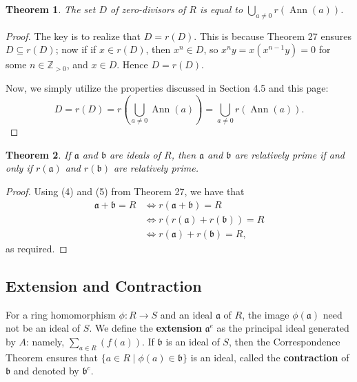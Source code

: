 \documentclass[11pt]{article}
\newtheorem{theorem}{Theorem}
\newcommand{\Ann}{\operatorname{Ann}}
\begin{document}
\begin{adjustwidth}{0.5cm}{}
	\begin{theorem}
		The set $D$ of zero-divisors of $R$ is equal to $\bigcup\limits_{a \ne 0} r(\Ann (a))$.
	\end{theorem}
	\begin{proof}
		The key is to realize that $D = r(D)$. This is because Theorem 27 ensures $D \subseteq r(D)$; now if if $x \in r(D)$, then $x^{n} \in D$, so $x^{n}y = x(x^{n - 1}y) = 0$ for some $n \in \mathbb{Z}_{> 0}$, and $x \in D$. Hence $D = r(D)$.

		Now, we simply utilize the properties discussed in Section 4.5 and this page:
		\[
			D = r(D) = r \left( \bigcup\limits_{a \ne 0} \Ann (a) \right) = \bigcup\limits_{a \ne 0} r (\Ann (a)).
		\]
	\end{proof}
\end{adjustwidth}

\begin{adjustwidth}{0.5cm}{}
	\begin{theorem}
		If $\mathfrak{a}$ and $\mathfrak{b}$ are ideals of $R$, then $\mathfrak{a}$ and $\mathfrak{b}$ are relatively prime if and only if $r(\mathfrak{a})$ and $r(\mathfrak{b})$ are relatively prime.
	\end{theorem}
	\begin{proof}
		Using (4) and (5) from Theorem 27, we have that
		\begin{align*}
			\mathfrak{a} + \mathfrak{b} = R &\iff r(\mathfrak{a} + \mathfrak{b}) = R \\
			&\iff r(r(\mathfrak{a}) + r(\mathfrak{b})) = R \\
			&\iff r(\mathfrak{a}) + r(\mathfrak{b}) = R,
		\end{align*}
		as required.
	\end{proof}
\end{adjustwidth}


\subsection{Extension and Contraction}

For a ring homomorphism $\phi : R \to S$ and an ideal $\mathfrak{a}$ of $R$, the image $\phi(\mathfrak{a})$ need not be an ideal of $S$. We define the \textbf{extension} $\mathfrak{a}^{e}$ as the principal ideal generated by $A$: namely, $\sum_{a \in R} (f(a))$. If $\mathfrak{b}$ is an ideal of $S$, then the Correspondence Theorem ensures that $\{ a \in R \mid \phi(a) \in \mathfrak{b} \}$ is an ideal, called the \textbf{contraction} of $\mathfrak{b}$ and denoted by $\mathfrak{b}^{c}$.
\end{document}
